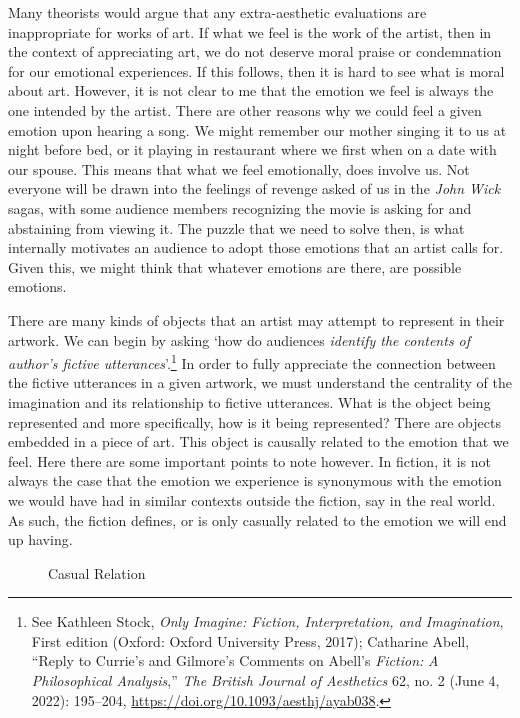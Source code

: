\documentclass[phdthesis,12pt,final]{wuthesis}
\theoremstyle{definition}
\theoremstyle{definition}
\theoremstyle{definition}
\theoremstyle{definition}
\theoremstyle{remark}
\begin{document}
Many theorists would argue that any extra-aesthetic evaluations are inappropriate for works of art. If what we feel is the work of the artist, then in the context of appreciating art, we do not deserve moral praise or condemnation for our emotional experiences. If this follows, then it is hard to see what is moral about art. However, it is not clear to me that the emotion we feel is always the one intended by the artist. There are other reasons why we could feel a given emotion upon hearing a song. We might remember our mother singing it to us at night before bed, or it playing in restaurant where we first when on a date with our spouse. This means that what we feel emotionally, does involve us. Not everyone will be drawn into the feelings of revenge asked of us in the \emph{John Wick} sagas, with some audience members recognizing the movie is asking for and abstaining from viewing it. The puzzle that we need to solve then, is what internally motivates an audience to adopt those emotions that an artist calls for. Given this, we might think that whatever emotions are there, are possible emotions.

There are many kinds of objects that an artist may attempt to represent in their artwork. We can begin by asking `how do audiences \emph{identify the contents of author's fictive utterances}'.\footnote{See Kathleen Stock, \emph{Only Imagine: Fiction, Interpretation, and Imagination}, First edition (Oxford: Oxford University Press, 2017); Catharine Abell, {``Reply to {Currie}'s and {Gilmore}'s Comments on {Abell}'s {\emph{Fiction}}{\emph{:} }{\emph{A Philosophical Analysis}},''} \emph{The British Journal of Aesthetics} 62, no. 2 (June 4, 2022): 195--204, \url{https://doi.org/10.1093/aesthj/ayab038}.} In order to fully appreciate the connection between the fictive utterances in a given artwork, we must understand the centrality of the imagination and its relationship to fictive utterances. What is the object being represented and more specifically, how is it being represented? There are objects embedded in a piece of art. This object is causally related to the emotion that we feel. Here there are some important points to note however. In fiction, it is not always the case that the emotion we experience is synonymous with the emotion we would have had in similar contexts outside the fiction, say in the real world. As such, the fiction defines, or is only casually related to the emotion we will end up having.

\begin{figure}
\centering
\caption{Casual Relation}
\label{fig:casual}
\end{figure}
\end{document}

